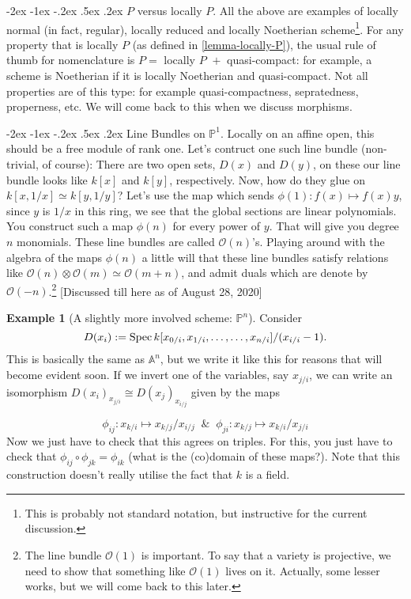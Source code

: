 \documentclass[11pt]{amsart}
\makeatletter
\renewcommand\subsection{\@startsection {subsection}{1}{\z@}%
	{-2ex \@plus -1ex \@minus -.2ex}%
	{.5ex \@plus.2ex}%
	{\normalfont\bfseries}}
\newcommand{\Spec}{{\rm Spec \,}}
\newcommand{\sO}{{\mathcal O}}
\newcommand{\A}{{\mathbb A}}
\renewcommand{\P}{{\mathbb P}}
\theoremstyle{definition}
\newtheorem{example}[theorem]{Example}
\makeatother
\begin{document}
\subsection{\texorpdfstring{$P$}{P} versus locally \texorpdfstring{$P$}{P}.}
\label{subsection-P-versus-locallyP}
All the above are examples of locally normal (in fact, regular), locally reduced and locally Noetherian scheme\footnote{This is probably not standard notation, but instructive for the current discussion.}. For any property that is locally $P$ (as defined in \ref{lemma-locally-P}), the usual rule of thumb for nomenclature is $P=$ locally $P\,\,+$ quasi-compact: for example, a scheme is Noetherian if it is locally Noetherian and quasi-compact. Not all properties are of this type: for example quasi-compactness, sepratedness, properness, etc. We will come back to this when we discuss morphisms.



\subsection{Line Bundles on \texorpdfstring{$\P^1$}{P1}.}
\label{P1-line-bundles}
 Locally on an affine open, this should be a free module of rank one. Let's contruct one such line bundle (non-trivial, of course): There are two open sets, $D(x)$ and $D(y)$, on these our line bundle looks like $k[x]$ and $k[y]$, respectively. Now, how do they glue on $k[x,1/x]\simeq k[y,1/y]$? Let's use the map which sends $\phi(1):f(x)\mapsto f(x)y$, since $y$ is $1/x$ in this ring, we see that the global sections are linear polynomials. You construct such a map $\phi(n)$ for every power of $y$. That will give you degree $n$ monomials. These line bundles are called $\sO(n)$'s. Playing around with the algebra of the maps $\phi(n)$ a little will that these line bundles satisfy relations like $\sO(n)\otimes\sO(m)\simeq \sO(m+n)$, and admit duals which are denote by $\sO(-n)$.\footnote{The line bundle $\sO(1)$ is important. To say that a variety is projective, we need to show that something like $\sO(1)$ lives on it. Actually, some lesser works, but we will come back to this later.}
[Discussed till here as of August 28, 2020]


\begin{example}[A slightly more involved scheme: \texorpdfstring{$\P^n$}{Pn}]\label{example-projective-space}
Consider 
\[D(x_i):= \Spec k[x_{0/i},x_{1/i},\ldots,\ldots,x_{n/i}]/(x_{i/i}-1).\]
This is basically the same as $\A^n$, but we write it like this for reasons that will become evident soon. If we invert one of the variables, say $x_{j/i}$, we can write an isomorphism $D(x_i)_{x_{j/i}}\cong D(x_j)_{x_{i/j}}$ given by the maps 

\[\phi_{ij}:x_{k/i}\mapsto x_{k/j}/x_{i/j}\;\; \&\;\; \phi_{ji}:x_{k/j}\mapsto x_{k/i}/x_{j/i}\]
Now we just have to check that this agrees on triples. For this, you just have to check that $\phi_{ij}\circ\phi_{jk}=\phi_{ik}$ (what is the (co)domain of these maps?). Note that this construction doesn't really utilise the fact that $k$ is a field.
\end{example}
\end{document}
